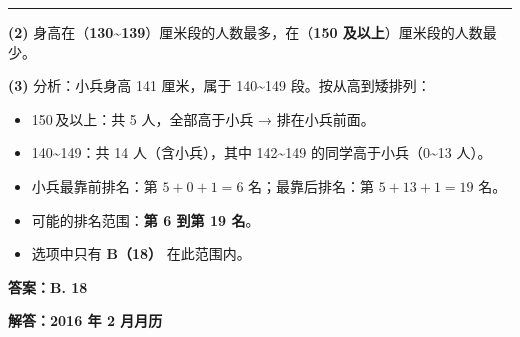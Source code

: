 \vspace{1.0cm}
\hrule
\vspace{0.4cm}

{\small
\textbf{(2)} 身高在（\textbf{130\textasciitilde139}）厘米段的人数最多，在（\textbf{150 及以上}）厘米段的人数最少。

\vspace{0.5cm}
\textbf{(3)} 分析：小兵身高 141 厘米，属于 140\textasciitilde149 段。按从高到矮排列：
\begin{itemize}
  \item 150\,及以上：共 5 人，全部高于小兵 → 排在小兵前面。
  \item 140\textasciitilde149：共 14 人（含小兵），其中 142\textasciitilde149 的同学高于小兵（0\textasciitilde13 人）。
  \item 小兵最靠前排名：第 $5+0+1=6$ 名；最靠后排名：第 $5+13+1=19$ 名。
  \item 可能的排名范围：\textbf{第 6 到第 19 名}。
  \item 选项中只有 \textbf{B（18）} 在此范围内。
\end{itemize}
\textbf{答案：B. 18}
}




\newpage

\begin{center}
  {\large\bfseries 解答：2016 年 2 月月历}
\end{center}

\vspace{0.5cm}


\vspace{0.5cm}

